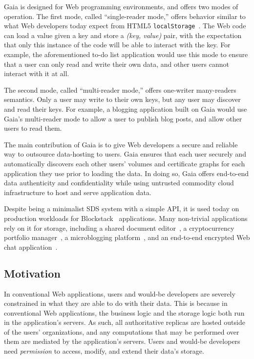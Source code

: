Gaia is designed for Web programming environments, and offers two
modes of operation.  The first mode, called ``single-reader mode,'' offers
behavior similar to what Web developers today expect from HTML5
\texttt{localStorage}~\cite{w3c-localstorage}.  The Web code can load a value
given a key and store a \emph{(key, value)} pair, with the expectation that only this
instance of the code will be able to interact with the key.  For example, 
the aforementioned to-do list application would use this mode to ensure that a user can
only read and write their own data, and other users cannot interact with it at
all.

The second mode, called ``multi-reader mode,'' offers one-writer many-readers
semantics.  Only a user may write to their own keys, but any user may discover
and read their keys.  For example, a blogging application built on Gaia would
use Gaia's multi-reader mode to allow a user to publish blog posts, and allow
other users to read them.

The main contribution of Gaia is to give Web developers a secure and
reliable way to outsource data-hosting to users.  Gaia ensures that each user
securely and automatically discovers each other users' volumes and certificate
graphs for each application they use prior to loading the data.
In doing so, Gaia offers end-to-end
data authenticity and confidentiality while using untrusted commodity cloud infrastructure
to host and serve application data.

Despite being a minimalist SDS system with a simple API, it is used today on
production workloads for Blockstack~\cite{blockstack} applications.  Many
non-trivial applications rely on it for storage, including a shared document
editor~\cite{graphite-docs}, a cryptocurrency portfolio
manager~\cite{coins}, a microblogging
platform~\cite{publik}, and
an end-to-end encrypted Web chat application~\cite{stealthy.im}.

\subsection{Motivation}

In conventional Web applications, users and would-be developers are severely
constrained in what they are able to do with their data.  This is because in
conventional Web applications, the business logic and the storage logic both run
in the application's servers.  As such, all authoritative replicas are hosted
outside of the users' organizations, and any computations that may be performed
over them are mediated by the application's servers.  Users and would-be
developers need \emph{permission} to access, modify, and extend their data's
storage.


